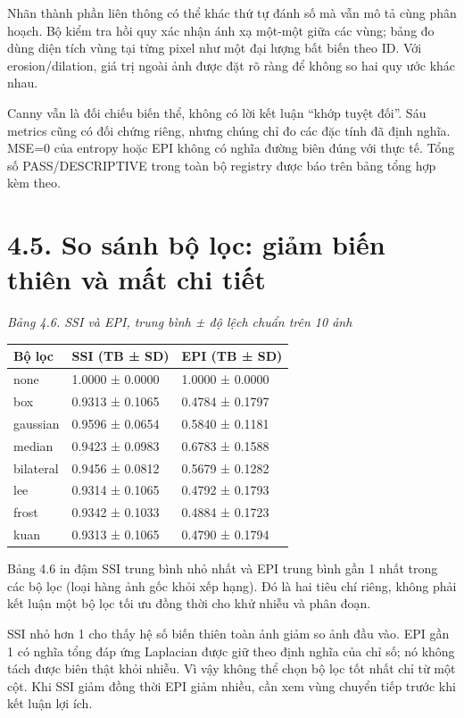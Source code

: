\documentclass[13pt,a4paper]{extreport}
\begin{document}
\par
Nhãn thành phần liên thông có thể khác thứ tự đánh số mà vẫn mô tả cùng phân hoạch. Bộ kiểm tra hồi quy xác nhận ánh xạ một-một giữa các vùng; bảng đo dùng diện tích vùng tại từng pixel như một đại lượng bất biến theo ID. Với erosion/dilation, giá trị ngoài ảnh được đặt rõ ràng để không so hai quy ước khác nhau.
\par
Canny vẫn là đối chiếu biến thể, không có lời kết luận “khớp tuyệt đối”. Sáu metrics cũng có đối chứng riêng, nhưng chúng chỉ đo các đặc tính đã định nghĩa. MSE=0 của entropy hoặc EPI không có nghĩa đường biên đúng với thực tế. Tổng số PASS/DESCRIPTIVE trong toàn bộ registry được báo trên bảng tổng hợp kèm theo.
\par
\clearpage
\section*{4.5. So sánh bộ lọc: giảm biến thiên và mất chi tiết}
\noindent\textit{Bảng 4.6. SSI và EPI, trung bình ± độ lệch chuẩn trên 10 ảnh}
\begin{longtable}{p{4.87cm}|p{4.87cm}|p{4.87cm}}
Bộ lọc & SSI (TB ± SD) & EPI (TB ± SD)\\\hline
none & 1.0000 ± 0.0000 & 1.0000 ± 0.0000\\\hline
box & 0.9313 ± 0.1065 & 0.4784 ± 0.1797\\\hline
gaussian & 0.9596 ± 0.0654 & 0.5840 ± 0.1181\\\hline
median & 0.9423 ± 0.0983 & 0.6783 ± 0.1588\\\hline
bilateral & 0.9456 ± 0.0812 & 0.5679 ± 0.1282\\\hline
lee & 0.9314 ± 0.1065 & 0.4792 ± 0.1793\\\hline
frost & 0.9342 ± 0.1033 & 0.4884 ± 0.1723\\\hline
kuan & 0.9313 ± 0.1065 & 0.4790 ± 0.1794\\\hline
\end{longtable}
Bảng 4.6 in đậm SSI trung bình nhỏ nhất và EPI trung bình gần 1 nhất trong các bộ lọc (loại hàng ảnh gốc khỏi xếp hạng). Đó là hai tiêu chí riêng, không phải kết luận một bộ lọc tối ưu đồng thời cho khử nhiễu và phân đoạn.
\par
SSI nhỏ hơn 1 cho thấy hệ số biến thiên toàn ảnh giảm so ảnh đầu vào. EPI gần 1 có nghĩa tổng đáp ứng Laplacian được giữ theo định nghĩa của chỉ số; nó không tách được biên thật khỏi nhiễu. Vì vậy không thể chọn bộ lọc tốt nhất chỉ từ một cột. Khi SSI giảm đồng thời EPI giảm nhiều, cần xem vùng chuyển tiếp trước khi kết luận lợi ích.
\end{document}

